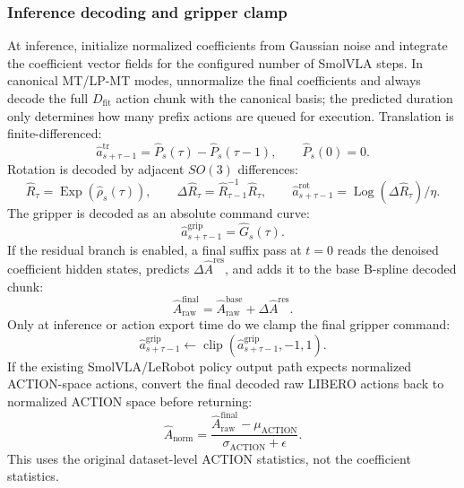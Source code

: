 \documentclass[10pt,twocolumn,letterpaper]{article}
\begin{document}
\subsubsection*{Inference decoding and gripper clamp}
At inference, initialize normalized coefficients from Gaussian noise and integrate the coefficient vector fields for the configured number of SmolVLA steps. In canonical MT/LP-MT modes, unnormalize the final coefficients and always decode the full $D_{\mathrm{fit}}$ action chunk with the canonical basis; the predicted duration only determines how many prefix actions are queued for execution. Translation is finite-differenced:
\begin{equation}
\hat a_{s+\tau-1}^{\mathrm{tr}}=
\hat P_s(\tau)-\hat P_s(\tau-1),
\qquad \hat P_s(0)=0.
\end{equation}
Rotation is decoded by adjacent $SO(3)$ differences:
\begin{equation}
\hat R_\tau=\operatorname{Exp}(\hat\rho_s(\tau)),
\qquad
\Delta\hat R_\tau=\hat R_{\tau-1}^{-1}\hat R_\tau,
\qquad
\hat a_{s+\tau-1}^{\mathrm{rot}}=\operatorname{Log}(\Delta\hat R_\tau)/\eta.
\end{equation}
The gripper is decoded as an absolute command curve:
\begin{equation}
\hat a_{s+\tau-1}^{\mathrm{grip}}=\hat G_s(\tau).
\end{equation}
If the residual branch is enabled, a final suffix pass at $t=0$ reads the denoised coefficient hidden states, predicts $\Delta\hat A^{\mathrm{res}}$, and adds it to the base B-spline decoded chunk:
\begin{equation}
\hat A_{\mathrm{raw}}^{\mathrm{final}}
=
\hat A_{\mathrm{raw}}^{\mathrm{base}}
+
\Delta\hat A^{\mathrm{res}}.
\end{equation}
Only at inference or action export time do we clamp the final gripper command:
\begin{equation}
\hat a_{s+\tau-1}^{\mathrm{grip}}\leftarrow
\operatorname{clip}\left(\hat a_{s+\tau-1}^{\mathrm{grip}},-1,1\right).
\end{equation}
If the existing SmolVLA/LeRobot policy output path expects normalized ACTION-space actions, convert the final decoded raw LIBERO actions back to normalized ACTION space before returning:
\begin{equation}
\hat A_{\mathrm{norm}}=
\frac{\hat A_{\mathrm{raw}}^{\mathrm{final}}-\mu_{\mathrm{ACTION}}}{\sigma_{\mathrm{ACTION}}+\epsilon}.
\end{equation}
This uses the original dataset-level ACTION statistics, not the coefficient statistics.
\end{document}
